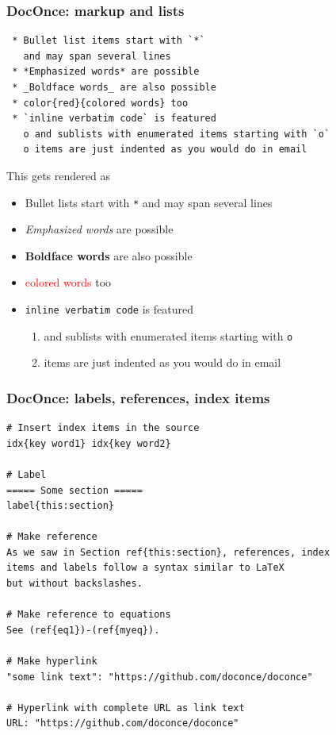 \documentclass{beamer}
\newcounter{doconce:movie:counter}
\begin{document}
\begin{frame}
\frametitle{DocOnce: markup and lists}

\begin{verbatim}
 * Bullet list items start with `*`
   and may span several lines
 * *Emphasized words* are possible
 * _Boldface words_ are also possible
 * color{red}{colored words} too
 * `inline verbatim code` is featured
   o and sublists with enumerated items starting with `o`
   o items are just indented as you would do in email

\end{verbatim}


This gets rendered as

\begin{itemize}
 \item Bullet lists start with \texttt{*} and may span several lines

 \item \emph{Emphasized words} are possible

 \item \textbf{Boldface words} are also possible

 \item \textcolor{red}{colored words} too

 \item \texttt{inline verbatim code} is featured
\begin{enumerate}

  \item and sublists with enumerated items starting with \texttt{o}

  \item items are just indented as you would do in email
\end{enumerate}

\noindent
\end{itemize}

\noindent
\end{frame}

\begin{frame}
\frametitle{DocOnce: labels, references, index items}

\begin{verbatim}
# Insert index items in the source
idx{key word1} idx{key word2}

# Label
===== Some section =====
label{this:section}

# Make reference
As we saw in Section ref{this:section}, references, index
items and labels follow a syntax similar to LaTeX
but without backslashes.

# Make reference to equations
See (ref{eq1})-(ref{myeq}).

# Make hyperlink
"some link text": "https://github.com/doconce/doconce"

# Hyperlink with complete URL as link text
URL: "https://github.com/doconce/doconce"

\end{verbatim}
\end{frame}
\end{document}
